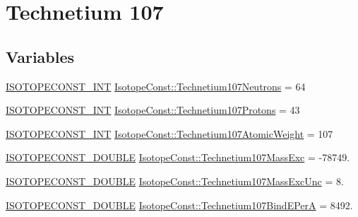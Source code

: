 \hypertarget{group___isotope_const-_technetium-_tc107}{}\section{Technetium 107}
\label{group___isotope_const-_technetium-_tc107}
\subsection*{Variables}
\begin{DoxyCompactItemize}
\item 
\mbox{\hyperlink{group___isotope_const-_macros_ga5f18360b3e99483a35c32d789e62621c}{I\+S\+O\+T\+O\+P\+E\+C\+O\+N\+S\+T\+\_\+\+I\+NT}} \mbox{\hyperlink{group___isotope_const-_technetium-_tc107_ga93a81ba647ea4b8bd32982f420224c9c}{Isotope\+Const\+::\+Technetium107\+Neutrons}} = 64
\item 
\mbox{\hyperlink{group___isotope_const-_macros_ga5f18360b3e99483a35c32d789e62621c}{I\+S\+O\+T\+O\+P\+E\+C\+O\+N\+S\+T\+\_\+\+I\+NT}} \mbox{\hyperlink{group___isotope_const-_technetium-_tc107_gac34b66df45801ca155073ad9fe09c7e6}{Isotope\+Const\+::\+Technetium107\+Protons}} = 43
\item 
\mbox{\hyperlink{group___isotope_const-_macros_ga5f18360b3e99483a35c32d789e62621c}{I\+S\+O\+T\+O\+P\+E\+C\+O\+N\+S\+T\+\_\+\+I\+NT}} \mbox{\hyperlink{group___isotope_const-_technetium-_tc107_ga366b834e8d9d8ea344736aa7164bc827}{Isotope\+Const\+::\+Technetium107\+Atomic\+Weight}} = 107
\item 
\mbox{\hyperlink{group___isotope_const-_macros_ga8f45a7272ce02c0b4c65c44636ed719a}{I\+S\+O\+T\+O\+P\+E\+C\+O\+N\+S\+T\+\_\+\+D\+O\+U\+B\+LE}} \mbox{\hyperlink{group___isotope_const-_technetium-_tc107_gab2ed452792985989202680b33eb2c7af}{Isotope\+Const\+::\+Technetium107\+Mass\+Exc}} = -\/78749.
\item 
\mbox{\hyperlink{group___isotope_const-_macros_ga8f45a7272ce02c0b4c65c44636ed719a}{I\+S\+O\+T\+O\+P\+E\+C\+O\+N\+S\+T\+\_\+\+D\+O\+U\+B\+LE}} \mbox{\hyperlink{group___isotope_const-_technetium-_tc107_ga5310ff4dccf9121552dde94647cb2143}{Isotope\+Const\+::\+Technetium107\+Mass\+Exc\+Unc}} = 8.
\item 
\mbox{\hyperlink{group___isotope_const-_macros_ga8f45a7272ce02c0b4c65c44636ed719a}{I\+S\+O\+T\+O\+P\+E\+C\+O\+N\+S\+T\+\_\+\+D\+O\+U\+B\+LE}} \mbox{\hyperlink{group___isotope_const-_technetium-_tc107_gadc0a928c288f65c8acf20c7be3ac908f}{Isotope\+Const\+::\+Technetium107\+Bind\+E\+PerA}} = 8492.

\end{DoxyCompactItemize}
